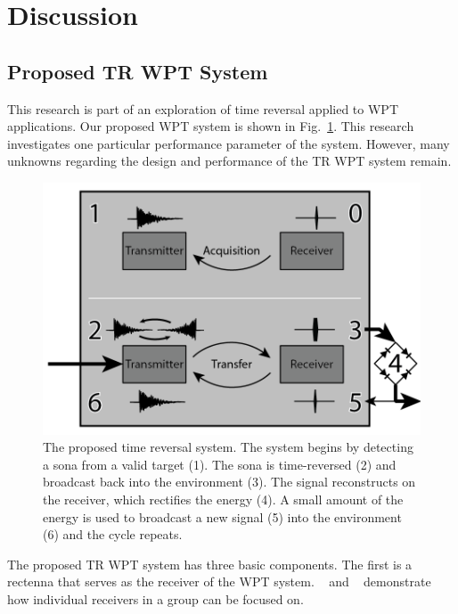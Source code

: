 \section{Discussion}

\subsection{Proposed TR WPT System}
\label{sec:WPTSys}

This research is part of an exploration of time reversal applied to WPT applications. Our proposed WPT system is shown in Fig.~\ref{fig:SysImage}. This research investigates one particular performance parameter of the system. However, many unknowns regarding the design and performance of the TR WPT system remain.

\begin{figure}[t!]
\includegraphics[width=\columnwidth]{figs/WPTSys.png}
\caption{The proposed time reversal system. The system begins by detecting a sona from a valid target (1). The sona is time-reversed (2) and broadcast back into the environment (3). The signal reconstructs on the receiver, which rectifies the energy (4).  A small amount of the energy is used to broadcast a new signal (5) into the environment (6) and the cycle repeats.}
\label{fig:SysImage}
\end{figure}


The proposed TR WPT system has three basic components. The first is a rectenna that serves as the receiver of the WPT system. ~\cite{FRAZIER} and ~\cite{ROMAN}  demonstrate how individual receivers in a group can be focused on.

